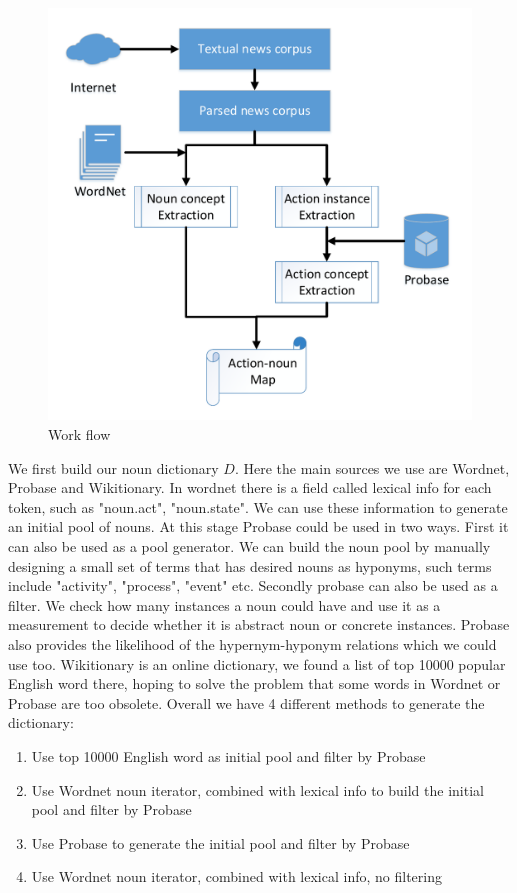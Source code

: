 \begin{figure}[!htp]
 \centering
 \includegraphics[width=\linewidth]{img/flow.pdf}
 \caption{Work flow}
\end{figure}

We first build our noun dictionary $D$. Here the main sources we use 
are Wordnet, Probase and Wikitionary. 
In wordnet there is a field called lexical info for each token,
such as "noun.act", "noun.state". We can use these information to generate an
initial pool of nouns. At this stage Probase could be used in two ways. 
First it can also be used as a pool generator. 
We can build the noun pool by manually designing
a small set of terms that has desired nouns as hyponyms, such terms include "activity",
"process", "event" etc. Secondly probase can also be used as a filter. We check how
many instances a noun could have and use it as a measurement to decide whether it
is abstract noun or concrete instances. Probase also provides the likelihood of
the hypernym-hyponym relations which we could use too. Wikitionary is an online
dictionary, we found a list of top 10000 popular English word there, hoping to
solve the problem that some words in Wordnet or Probase are too obsolete.
Overall we have 4 different methods to generate the dictionary:
\begin{enumerate}
\item Use top 10000 English word as initial pool and filter by Probase
\item Use Wordnet noun iterator, combined with lexical info to build the initial pool and filter by Probase
\item Use Probase to generate the initial pool and filter by Probase
\item Use Wordnet noun iterator, combined with lexical info, no filtering
\end{enumerate}


